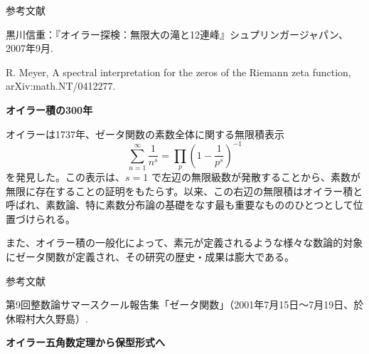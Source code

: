 \documentclass[uplatex,dvipdfmx]{jlreq}
\begin{document}
\begin{center}\textsc{参考文献}\end{center}
\begin{enumerate}[{[1]}]
  \item 黒川信重：『オイラー探検：無限大の滝と12連峰』シュプリンガージャパン、2007年9月.
  \item R. Meyer, A spectral interpretation for the zeros of the Riemann zeta function, arXiv:math.NT/0412277.
\end{enumerate}

\newpage

\begin{center}
{\large\bfseries オイラー積の300年}\\[6pt]
\hspace*{\fill}{\large\bfseries 平野　幹（成蹊大学・理工学部）}
\end{center}

オイラーは1737年、ゼータ関数の素数全体に関する無限積表示
\[
\sum_{n=1}^\infty \frac{1}{n^s}=\prod_p\left(1-\frac{1}{p^s}\right)^{-1}
\]
を発見した。この表示は、$s=1$ で左辺の無限級数が発散することから、素数が無限に存在することの証明をもたらす。以来、この右辺の無限積はオイラー積と呼ばれ、素数論、特に素数分布論の基礎をなす最も重要なもののひとつとして位置づけられる。

また、オイラー積の一般化によって、素元が定義されるような様々な数論的対象にゼータ関数が定義され、その研究の歴史・成果は膨大である。

\begin{center}\textsc{参考文献}\end{center}
\begin{enumerate}[{[1]}]
  \item 第9回整数論サマースクール報告集「ゼータ関数」（2001年7月15日〜7月19日、於 休暇村大久野島）.
\end{enumerate}

\newpage

\begin{center}
{\large\bfseries オイラー五角数定理から保型形式へ}\\[6pt]
\hspace*{\fill}{\large\bfseries 権　寧魯（九州大学・数理学研究院）}
\end{center}
\end{document}
